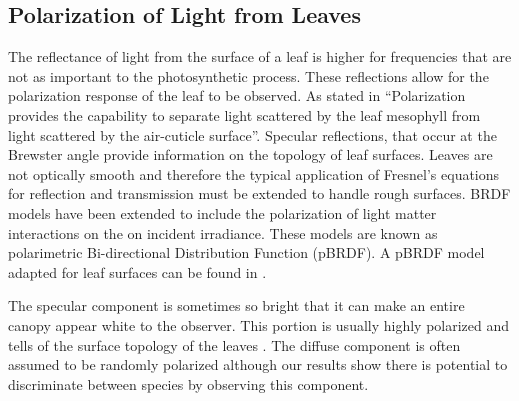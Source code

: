 \subsection{Polarization of Light from Leaves}

The reflectance of light from the surface of a leaf is higher for frequencies that are not as important to the photosynthetic process. These reflections allow for the polarization response of the leaf to be observed.  As stated in \cite{photonvegetation} “Polarization provides the capability to separate light scattered by the leaf mesophyll from light scattered by the air-cuticle surface”.  Specular reflections, that occur at the Brewster angle provide information on the topology of leaf surfaces.  Leaves are not optically smooth and therefore the typical application of Fresnel’s equations for reflection and transmission must be extended to handle rough surfaces. BRDF models have been extended to include the polarization of light matter interactions on the on incident irradiance.  These models are known as polarimetric Bi-directional Distribution Function (pBRDF).  A pBRDF model adapted for leaf surfaces can be found in \cite{photonvegetation}.

The specular component is sometimes so bright that it can make an entire canopy appear white to the observer.  This portion is usually highly polarized and tells of the surface topology of the leaves \cite{vanderbilt}.  The diffuse component is often assumed to be randomly polarized although our results show there is potential to discriminate between species by observing this component.
